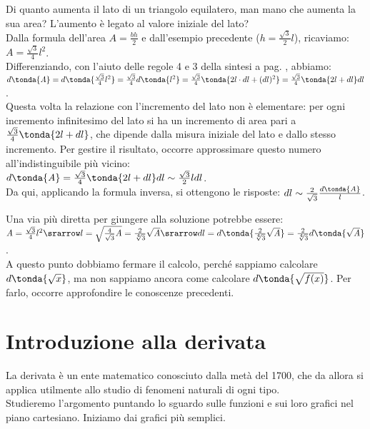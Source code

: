 \begin{esempio}
Di quanto aumenta il lato di un triangolo equilatero,
man mano che aumenta la sua area? L'aumento è legato al valore iniziale del 
lato?\\
Dalla formula dell'area $\mathit{A}=\frac{bh}{2}$ e dall'esempio precedente
($h=\frac{\sqrt{3}}{2}l$), ricaviamo: $\mathit{A}=\frac{\sqrt{3}}{4}l^2$.\\
Differenziando, con l'aiuto delle regole 4 e 3 della sintesi a pag.
\pageref{subsubsec:diff01_diffsint}, abbiamo:\\
$d\tonda{\mathit{A}}=d\tonda{\frac{\sqrt{3}}{4}l^2}=
 \frac{\sqrt{3}}{4}d\tonda{l^2}=
 \frac{\sqrt{3}}{4}\tonda{2l \cdot dl+(dl)^2}=
 \frac{\sqrt{3}}{4}\tonda{2l+dl}dl$.\\
Questa volta la relazione con l'incremento del lato non è elementare: per 
ogni 
incremento infinitesimo del lato si ha un incremento di area pari a 
$\frac{\sqrt{3}}{4}\tonda{2l+dl}$, che dipende dalla misura iniziale del 
lato
e dallo stesso incremento. Per gestire il risultato, occorre approssimare
questo numero all'indistinguibile più vicino:\\
$d\tonda{\mathit{A}}=\frac{\sqrt{3}}{4}\tonda{2l+dl}dl\sim
\frac{\sqrt{3}}{2}ldl$.\\
Da qui, applicando la formula inversa, si ottengono le 
risposte:
$dl\sim\frac{2}{\sqrt{3}}\frac{d\tonda{\mathit{A}}}{l}$.
\begin{osservazione}
 Una via più diretta per giungere alla soluzione potrebbe essere: \\
 $\mathit{A}=\frac{\sqrt{3}}{4}l^2\srarrow 
l=\sqrt{\frac{4}{\sqrt{3}}\mathit{A}}=
 \frac{2}{\sqrt[4]{3}}\sqrt{\mathit{A}}\srarrow dl=
 d\tonda{\frac{2}{\sqrt[4]{3}}\sqrt{\mathit{A}}}=
 \frac{2}{\sqrt[4]{3}}d\tonda{\sqrt{\mathit{A}}}$.\\
 A questo punto dobbiamo fermare il calcolo, perché 
 sappiamo calcolare $d\tonda{\sqrt{x}}$, ma 
 non sappiamo ancora come calcolare $d\tonda{\sqrt{f(x)}}$. Per farlo, 
 occorre approfondire le conoscenze precedenti.
\end{osservazione}
\end{esempio}

\section{Introduzione alla derivata}
\label{sec:diff01_derivata}
La derivata è un ente matematico conosciuto dalla metà del 1700, che 
da allora si applica utilmente allo studio di fenomeni naturali di ogni 
tipo.\\
Studieremo l'argomento puntando lo sguardo sulle funzioni e sui loro
grafici nel piano cartesiano. Iniziamo dai grafici più semplici.

